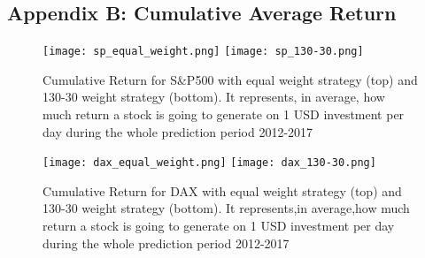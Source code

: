 \documentclass{article}
\begin{document}
\begin{appendix}
\clearpage
\section{Appendix B: Cumulative Average Return}
\label{appendix:b}

\begin{figure}[ht]
  \centering
  \texttt{[image: sp\_equal\_weight.png]}
  \texttt{[image: sp\_130-30.png]}
  \caption{Cumulative Return for S\&P500 with equal weight strategy (top) and 130-30 weight strategy (bottom). It represents, in average, how much return a stock is going to generate on 1 USD investment per day during the whole prediction period 2012-2017}
  \label{fig:SP500_weight_strategies}
\end{figure}

\begin{figure}[ht]
  \centering
  \texttt{[image: dax\_equal\_weight.png]}
  \texttt{[image: dax\_130-30.png]}
  \caption{Cumulative Return for DAX with equal weight strategy (top) and 130-30 weight strategy (bottom). It represents,in average,how much return a stock is going to generate on 1 USD investment per day during the whole prediction period 2012-2017}
  \label{fig:DAX_weight_strategies}
\end{figure}


\end{appendix}



\clearpage


\end{document}
